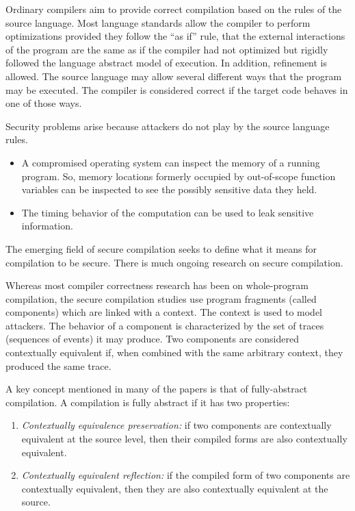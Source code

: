 Ordinary compilers aim to provide correct compilation based on the rules of the source language. Most language standards allow the compiler to perform optimizations provided they follow the ``as if'' rule, that the external interactions of the program are the same as if the compiler had not optimized but rigidly followed the language abstract model of execution. In addition, refinement is allowed. The source language may allow several different ways that the program may be executed. The compiler is considered correct if the target code behaves in one of those ways.

Security problems arise because attackers do not play by the source language rules.\autocites{20210614:sidhpurwala}{20210614:dsilva}
\begin{itemize}
	\item A compromised operating system can inspect the memory of a running program. So, memory locations formerly occupied by out-of-scope function variables can be inspected to see the possibly sensitive data they held.
	\item The timing behavior of the computation can be used to leak sensitive information.
\end{itemize}

The emerging field of secure compilation seeks to define what it means for compilation to be secure.\autocites{20210614:busi}{20210614:patrignani} There is much ongoing research on secure compilation. 

Whereas most compiler correctness research has been on whole-program compilation, the secure compilation studies use program fragments (called components) which are linked with a context. The context is used to model attackers. The behavior of a component is characterized by the set of traces (sequences of events) it may produce. Two components are considered contextually equivalent if, when combined with the same arbitrary context, they produced the same trace. 

A key concept mentioned in many of the papers is that of fully-abstract compilation. A compilation is fully abstract if it has two properties:
\begin{enumerate}
	\item \textit{Contextually equivalence preservation:} if two components are contextually equivalent at the source level, then their compiled forms are also contextually equivalent.
	\item \textit{Contextually equivalent reflection:} if the compiled form of two components are contextually equivalent, then they are also contextually equivalent at the source.
\end{enumerate}

